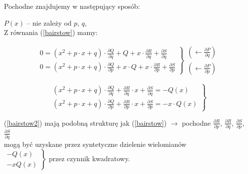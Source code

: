 \begin{frame}
  Pochodne znajdujemy w następujący sposób:

  $P(x)$ -- nie zależy od $p$, $q$, \\ Z równania (\ref{bairstow}) mamy:

  $$\left. \begin{array}{l}
  0 = (x^2 + p \cdot x + q) \cdot \frac{{\partial}Q}{{\partial}q} + Q + x \cdot \frac{{\partial}R}{{\partial}q} + \frac{{\partial}S}{{\partial}q} \\
  0 = (x^2 + p \cdot x + q) \cdot \frac{{\partial}Q}{{\partial}p} + x \cdot Q + x \cdot \frac{{\partial}R}{{\partial}p} + \frac{{\partial}S}{{\partial}p}
  \end{array}\right\}
  \begin{array}{l}
    \left( \leftarrow \frac{{\partial}P}{{\partial}q} \right) \\
    \left( \leftarrow \frac{{\partial}P}{{\partial}p} \right)
  \end{array}$$

  \begin{equation}
    \left. \begin{array}{l}
    (x^2 + p \cdot x + q) \cdot \frac{{\partial}Q}{{\partial}q} + \frac{{\partial}R}{{\partial}q} \cdot x + \frac{{\partial}S}{{\partial}q} = -Q(x) \\
    (x^2 + p \cdot x + q) \cdot \frac{{\partial}Q}{{\partial}p} + \frac{{\partial}R}{{\partial}p} \cdot x + \frac{{\partial}S}{{\partial}p} = -x \cdot Q(x)
    \end{array}\right\}
    \label{bairstow2}
  \end{equation}
\end{frame}

\begin{frame}
  (\ref{bairstow2}) mają podobną strukturę jak (\ref{bairstow}) $\rightarrow$ pochodne $\frac{{\partial}R}{{\partial}p}$, $\frac{{\partial}R}{{\partial}q}$, $\frac{{\partial}S}{{\partial}p}$, $\frac{{\partial}S}{{\partial}q}$ \\ \vspace{2mm} mogą być uzyskane przez syntetyczne dzielenie wielomianów \\ \vspace{3mm} $\left.\begin{array}{l} -Q(x) \\ -x Q(x) \end{array} \right\}$ przez czynnik kwadratowy.
\end{frame}
